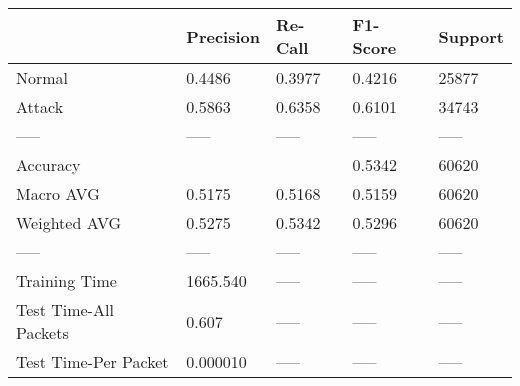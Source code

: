 \begin{tabular}{lllll}
\toprule
{} & Precision & Re-Call & F1-Score & Support \\
\midrule
Normal                &    0.4486 &  0.3977 &   0.4216 &   25877 \\
Attack                &    0.5863 &  0.6358 &   0.6101 &   34743 \\
-----                 &     ----- &   ----- &    ----- &   ----- \\
Accuracy              &           &         &   0.5342 &   60620 \\
Macro AVG             &    0.5175 &  0.5168 &   0.5159 &   60620 \\
Weighted AVG          &    0.5275 &  0.5342 &   0.5296 &   60620 \\
-----                 &     ----- &   ----- &    ----- &   ----- \\
Training Time         &  1665.540 &   ----- &    ----- &   ----- \\
Test Time-All Packets &     0.607 &   ----- &    ----- &   ----- \\
Test Time-Per Packet  &  0.000010 &   ----- &    ----- &   ----- \\
\bottomrule
\end{tabular}
